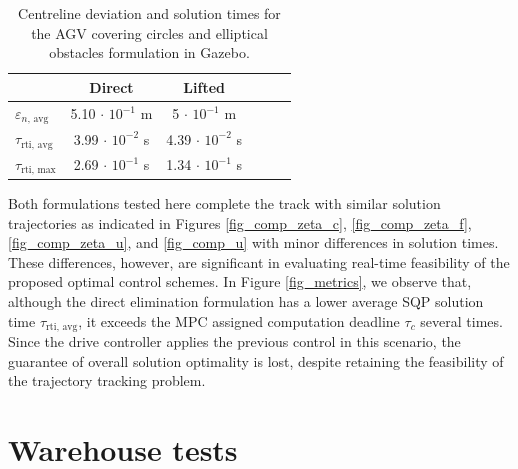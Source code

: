 \begin{table}[h!]
    \small
	\begin{center}
        \begin{tabular}{lccccl}\toprule
		    & \textbf{Direct} & \textbf{Lifted}\\
            \midrule
            $\varepsilon_{n,\,\mathrm{avg}} $ & 5.10 $\cdot$ $10^{-1}$ m& 5 $\cdot$ $10^{-1}$ m\\
            $\tau_{\mathrm{rti,\,avg}} $ & 3.99 $\cdot$ $10^{-2}$ s& 4.39 $\cdot$ $10^{-2}$ s\\
            $\tau_{\mathrm{rti,\,max}} $ & 2.69 $\cdot$ $10^{-1}$ s& 1.34 $\cdot$ $10^{-1}$ s\\
		    \bottomrule
		\end{tabular}
	\end{center}
    \caption{Centreline deviation and solution times for the \ac{AGV} covering circles and elliptical obstacles formulation in Gazebo.}
    \label{tab_rti_sim}
\end{table}

Both formulations tested here complete the track with similar solution trajectories as indicated in Figures \ref{fig_comp_zeta_c}, \ref{fig_comp_zeta_f}, \ref{fig_comp_zeta_u}, and \ref{fig_comp_u} with minor differences in solution times. These differences, however, are significant in evaluating real-time feasibility of the proposed optimal control schemes. In Figure \ref{fig_metrics}, we observe that, although the direct elimination formulation has a lower average SQP solution time $\tau_{\mathrm{rti,\,avg}}$, it exceeds the MPC assigned computation deadline $\tau_{c}$ several times. Since the drive controller applies the previous control in this scenario, the guarantee of overall solution optimality is lost, despite retaining the feasibility of the trajectory tracking problem.
\goodbreak
\newpage
\clearpage

\section{Warehouse tests}

